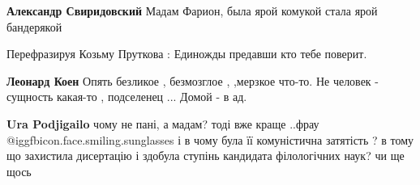 \begin{itemize}
\begin{itemize}
\textbf{Александр Свиридовский} Мадам Фарион, была ярой комукой стала ярой бандерякой

Перефразируя Козьму Пруткова :
Единожды предавши кто тебе поверит.

\textbf{Леонард Коен}
Опять безликое , безмозглое ,
,мерзкое что-то.
Не человек - сущность какая-то , подселенец ...
Домой - в ад.

\textbf{Ura Podjigailo} чому не пані, а мадам? тоді вже краще ..фрау @igg{fbicon.face.smiling.sunglasses}  і в чому була її комуністична затятість ? в тому що захистила дисертацію і здобула ступінь кандидата філологічних наук? чи ще щось

\end{itemize} %

\end{itemize} %
